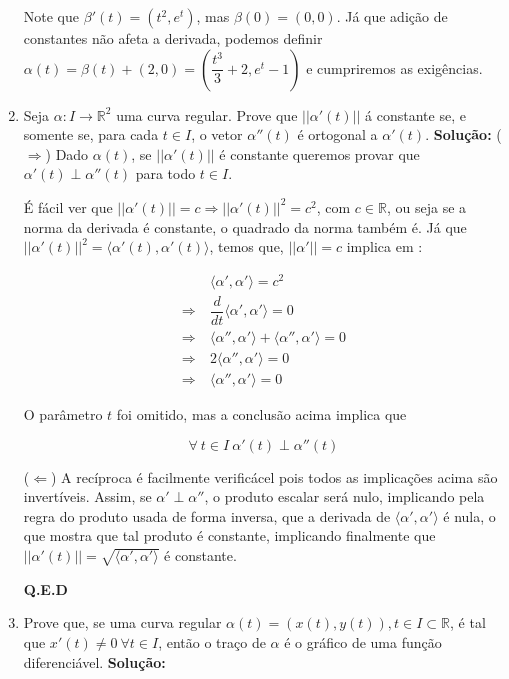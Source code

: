 \documentclass[12pt,letterpaper]{article}
\begin{document}
\begin{enumerate}
	Note que $\beta'(t)=(t^2 , e^t)$, mas $\beta(0)=(0,0)$. Já que adição de constantes não afeta a derivada, podemos definir $\alpha(t)=\beta(t)+(2,0)=\left(\dfrac{t^3}3+2,e^t-1\right)$ e cumpriremos as exigências.
	
	\item Seja $\alpha : I \to \mathbb{R}^2$ uma curva regular. Prove que $||\alpha'(t)||$ á constante se, e somente se,
	para cada $t \in I$, o vetor $\alpha'' (t)$ é ortogonal a $\alpha'(t)$.
	\subitem \textbf{Solução:} ($\Longrightarrow$) Dado $\alpha(t)$, se $||\alpha'(t)||$ é constante queremos provar que $\alpha' (t)\perp\alpha'' (t)$ para todo $t\in I$.
	
	É fácil ver que $||\alpha'(t)||=c\Rightarrow||\alpha'(t)||^2=c^2$, com $c\in\mathbb{R}$, ou seja se a norma da derivada é constante, o quadrado da norma também é. Já que $||\alpha'(t)||^2=\langle\alpha'(t),\alpha'(t)\rangle$, temos que, $||\alpha'||=c$ implica em :
	
	\begin{align*}
		&~\langle\alpha',\alpha'\rangle=c^2\\\Rightarrow&~
		\dfrac{d}{dt}\langle\alpha',\alpha'\rangle=0\\\Rightarrow&~
		\langle\alpha'',\alpha'\rangle+\langle\alpha'',\alpha'\rangle=0\\\Rightarrow&~
		2\langle\alpha'',\alpha'\rangle=0\\\Rightarrow&~
		\langle\alpha'',\alpha'\rangle=0
	\end{align*}
	
	O parâmetro $t$ foi omitido, mas a conclusão acima implica que 
	
	$$\forall ~t \in I~\alpha' (t)\perp\alpha'' (t)$$
	
	($\Longleftarrow$) A recíproca é facilmente verificácel pois todos as implicações acima são invertíveis. Assim, se $\alpha'\perp\alpha''$, o produto escalar será nulo, implicando pela regra do produto usada de forma inversa, que a derivada de  $\langle\alpha',\alpha'\rangle$ é nula, o que mostra que tal produto é constante, implicando finalmente que $||\alpha'(t)||=\sqrt{\langle\alpha',\alpha'\rangle}$ é constante. 
	\begin{flushright}
		\textbf{Q.E.D}
	\end{flushright}

	\item Prove que, se uma curva regular $\alpha(t) = (x(t), y(t)), t \in I \subset \mathbb{R}$, é tal que $x'(t) \neq  0~\forall t \in I$,	então o traço de $\alpha$ é o gráfico de uma função diferenciável.
	\subitem \textbf{Solução:}
	

\end{enumerate}
\end{document}
